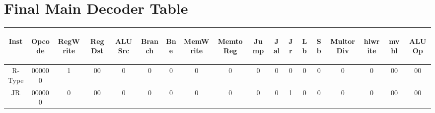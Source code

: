 \documentclass[titlepage,12pt,oneside,a4paper]{article}
\begin{document}
\section{Final Main Decoder Table}
\begin{center}
\begin{tabular}{|c|c|c|c|c|c|c|c|c|c|c|c|c|c|c|c|c|c|}
	\hline
\begin{turn}{-90}Inst\end{turn}&\begin{turn}{-90}Opcode\end{turn}&\begin{turn}{-90}RegWrite\end{turn}&\begin{turn}{-90}RegDst\end{turn}&\begin{turn}{-90}ALUSrc\end{turn}&\begin{turn}{-90}Branch\end{turn}&\begin{turn}{-90}Bne\end{turn}&\begin{turn}{-90}MemWrite\end{turn}&\begin{turn}{-90}MemtoReg\end{turn}&\begin{turn}{-90}Jump\end{turn}&\begin{turn}{-90}Jal\end{turn}&\begin{turn}{-90}Jr\end{turn}&\begin{turn}{-90}Lb\end{turn}&\begin{turn}{-90}Sb\end{turn}&\begin{turn}{-90}MultorDiv\end{turn}&\begin{turn}{-90}hlwrite\end{turn}&\begin{turn}{-90}mvhl\end{turn}&\begin{turn}{-90}ALUOp\end{turn}\\
\hline
R-Type & 000000 & 1 & 00 & 0 & 0 & 0 & 0 & 0 & 0 & 0 & 0 & 0 & 0 & 0 & 0 & 00 & 00 \\
\hline
JR & 000000 & 0 & 00 & 0 & 0 & 0 & 0 & 0 & 0 & 0 & 1 & 0 & 0 & 0 & 0 & 00 & 00 \\

\end{tabular}
\end{center}
\end{document}
